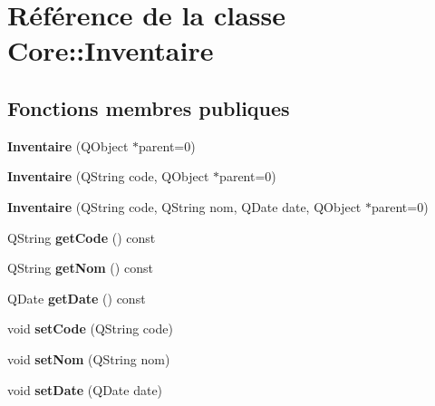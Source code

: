 \hypertarget{class_core_1_1_inventaire}{
\section{Référence de la classe Core::Inventaire}
\label{da/d65/class_core_1_1_inventaire}
}
\subsection*{Fonctions membres publiques}
\begin{DoxyCompactItemize}
\item 
\hypertarget{class_core_1_1_inventaire_ad01d4ffb33bad2ad7d21bfed4d7663ae}{
{\bfseries Inventaire} (QObject $\ast$parent=0)}
\label{da/d65/class_core_1_1_inventaire_ad01d4ffb33bad2ad7d21bfed4d7663ae}

\item 
\hypertarget{class_core_1_1_inventaire_afd5bb3033dc973009a155766df11dae5}{
{\bfseries Inventaire} (QString code, QObject $\ast$parent=0)}
\label{da/d65/class_core_1_1_inventaire_afd5bb3033dc973009a155766df11dae5}

\item 
\hypertarget{class_core_1_1_inventaire_a6c6a244b43135939b5982d2035335356}{
{\bfseries Inventaire} (QString code, QString nom, QDate date, QObject $\ast$parent=0)}
\label{da/d65/class_core_1_1_inventaire_a6c6a244b43135939b5982d2035335356}

\item 
\hypertarget{class_core_1_1_inventaire_a659e26afcdfc8e05ec3721e51c08807a}{
QString {\bfseries getCode} () const }
\label{da/d65/class_core_1_1_inventaire_a659e26afcdfc8e05ec3721e51c08807a}

\item 
\hypertarget{class_core_1_1_inventaire_a0fe45e53a18447ad719f5cc4925d198c}{
QString {\bfseries getNom} () const }
\label{da/d65/class_core_1_1_inventaire_a0fe45e53a18447ad719f5cc4925d198c}

\item 
\hypertarget{class_core_1_1_inventaire_a2528c5363e7132f6e267a12180795eae}{
QDate {\bfseries getDate} () const }
\label{da/d65/class_core_1_1_inventaire_a2528c5363e7132f6e267a12180795eae}

\item 
\hypertarget{class_core_1_1_inventaire_a26a0a69fa35afbb38e677c431941c95a}{
void {\bfseries setCode} (QString code)}
\label{da/d65/class_core_1_1_inventaire_a26a0a69fa35afbb38e677c431941c95a}

\item 
\hypertarget{class_core_1_1_inventaire_ae667fc03cd096433878fe25947344d12}{
void {\bfseries setNom} (QString nom)}
\label{da/d65/class_core_1_1_inventaire_ae667fc03cd096433878fe25947344d12}

\item 
\hypertarget{class_core_1_1_inventaire_a4e43ba68f958ac2435938eb033e71583}{
void {\bfseries setDate} (QDate date)}
\label{da/d65/class_core_1_1_inventaire_a4e43ba68f958ac2435938eb033e71583}

\end{DoxyCompactItemize}
